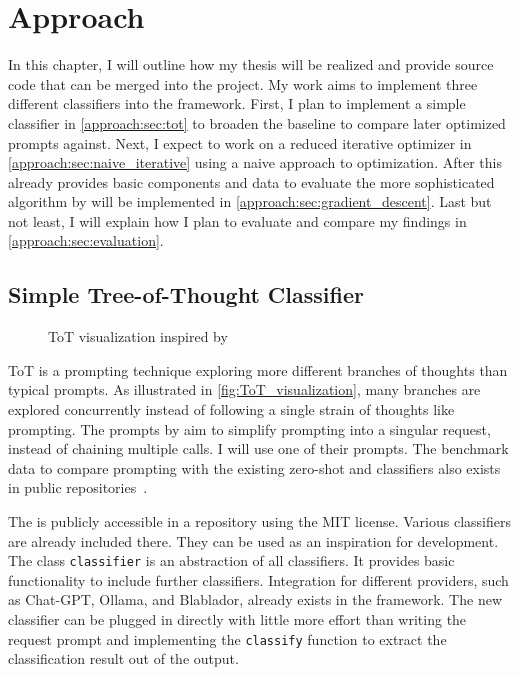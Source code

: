 \chapter{Approach}
In this chapter, I will outline how my thesis will be realized and provide source code that can be merged into the \LiSSA project.
My work aims to implement three different classifiers into the framework.
First, I plan to implement a simple \ToT classifier in \autoref{approach:sec:tot} to broaden the baseline to compare later optimized prompts against.
Next, I expect to work on a reduced iterative optimizer in \autoref{approach:sec:naive_iterative} using a naive approach to optimization.
After this already provides basic components and data to evaluate the more sophisticated algorithm by  will be implemented in \autoref{approach:sec:gradient_descent}.
Last but not least, I will explain how I plan to evaluate and compare my findings in \autoref{approach:sec:evaluation}.

\section{Simple Tree-of-Thought Classifier}
\label{approach:sec:tot}

\begin{figure}
    \centering
    
    \caption{\Ac{ToT} visualization inspired by }
    \label{fig:ToT_visualization}
\end{figure}

\Ac{ToT} is a prompting technique exploring more different branches of thoughts than typical \CoT prompts.
As illustrated in \autoref{fig:ToT_visualization}, many branches are explored concurrently instead of following a single strain of thoughts like \CoT prompting.
The prompts by  aim to simplify \ToT prompting into a singular request, instead of chaining multiple calls.
I will use one of their prompts.
The benchmark data to compare \ToT prompting with the existing zero-shot and \CoT classifiers also exists in public repositories~\cite{fuchss2022ArDoCoBenchmark, hey2025ReplicationPackage}.

The \LiSSAf is publicly accessible in a repository using the MIT license. Various classifiers are already included there.
They can be used as an inspiration for development.
The class \verb|classifier| is an abstraction of all classifiers.
It provides basic functionality to include further classifiers.
Integration for different \LLM providers, such as Chat-GPT, Ollama, and Blablador, already exists in the framework.
The new classifier can be plugged in directly with little more effort than writing the request prompt and implementing the \verb|classify| function to extract the classification result out of the \LLM output.

